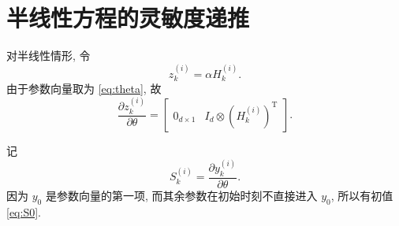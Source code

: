  \section{半线性方程的灵敏度递推}\label{sec:semilinearder}
    对半线性情形, 令
    \begin{equation*}
      z_{k}^{(i)} = \alpha H_{k}^{(i)}.
    \end{equation*}
    由于参数向量取为 \eqref{eq:theta}, 故
    \begin{equation}
      \frac{\partial z_{k}^{(i)}}{\partial \theta}
      =
      \begin{bmatrix}
        0_{d \times 1} & I_d \otimes (H_{k}^{(i)})^{\operatorname{T}}
      \end{bmatrix}.
      \label{eq:dzdtheta}
    \end{equation}

    记
    \begin{equation*}
      S_{k}^{(i)} = \frac{\partial y_{k}^{(i)}}{\partial \theta}.
    \end{equation*}
    因为 $y_{0}$ 是参数向量的第一项, 而其余参数在初始时刻不直接进入 $y_{0}$,
    所以有初值 \eqref{eq:S0}.

